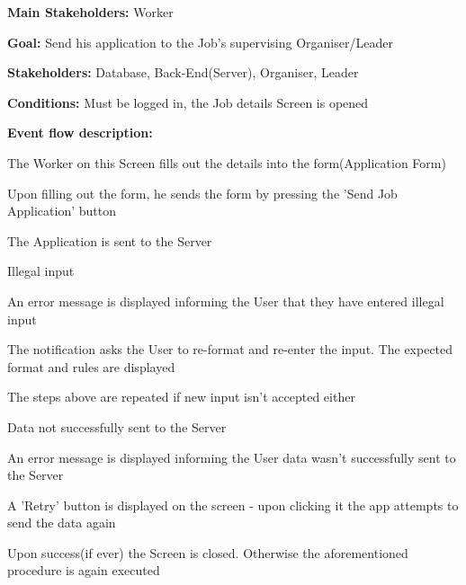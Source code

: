 				\noindent {}
				\begin{packed_item}
					\item \textbf{Main Stakeholders:} Worker
					\item \textbf{Goal:} Send his application to the Job's supervising Organiser/Leader
					\item \textbf{Stakeholders: } Database, Back-End(Server), Organiser, Leader
					\item \textbf{Conditions: } Must be logged in, the Job details Screen is opened
					\item \textbf{Event flow description: }
					\begin{packed_enum}
						\item The Worker on this Screen fills out the details into the form(Application Form)
						\item Upon filling out the form, he sends the form by pressing the 'Send Job Application' button
						\item The Application is sent to the Server
					\end{packed_enum}
					
					\begin{packed_item}
						\item[1.a] Illegal input
						\item[] \begin{packed_enum}
							\item An error message is displayed informing the User that they have entered illegal input
							\item The notification asks the User to re-format and re-enter the input. The expected format and rules are displayed
							\item The steps above are repeated if new input isn't accepted either
						\end{packed_enum}
						
						\item[3.a] Data not successfully sent to the Server
						\item[] \begin{packed_enum}
							\item An error message is displayed informing the User data wasn't successfully sent to the Server
							\item A 'Retry' button is displayed on the screen - upon clicking it the app attempts to send the data again
							\item Upon success(if ever) the Screen is closed. Otherwise the aforementioned procedure is again executed
						\end{packed_enum}
					\end{packed_item}
				\end{packed_item}
			
